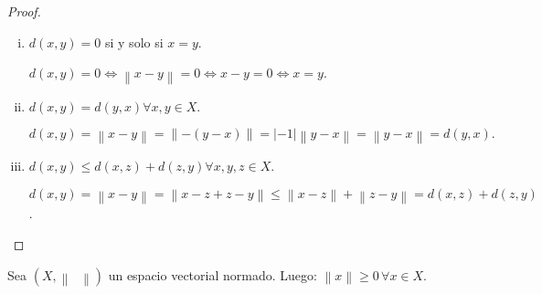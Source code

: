 \begin{proof}\leavevmode
    \begin{enumerate}[i)]
        \item $d\left(x,y\right)=0$ si y solo si $x=y$.


              \begin{math}
                  d\left(x,y\right)=
                  0\iff
                  \left\|x-y\right\|=
                  0\iff
                  x-y=
                  0\iff
                  x=
                  y
              \end{math}.

        \item

              \begin{math}
                  d\left(x,y\right)=
                  d\left(y,x\right)\forall
                  x,y\in X
              \end{math}.

              \begin{math}
                  d\left(x,y\right)=
                  \left\|x-y\right\|=
                  \left\|-\left(y-x\right)\right\|=
                  \left|-1\right|\left\|y-x\right\|=
                  \left\|y-x\right\|=
                  d\left(y,x\right).
              \end{math}


        \item

              \begin{math}
                  d\left(x,y\right)\leq
                  d\left(x,z\right)+d\left(z,y\right)\forall
                  x,y,z\in X
              \end{math}.

              \begin{math}
                  d\left(x,y\right)=
                  \left\|x-y\right\|=
                  \left\|x-z+z-y\right\|\leq
                  \left\|x-z\right\|+\left\|z-y\right\|=
                  d\left(x,z\right)+d\left(z,y\right)
              \end{math}.
    \end{enumerate}
\end{proof}

\begin{proposition*}
    Sea $\left(X, \left\|\phantom{\cdot}\right\|\right)$ un
    espacio vectorial normado.
    Luego:
    \begin{math}
        \left\|x\right\|\geq
        0\,\forall
        x\in X
    \end{math}.
\end{proposition*}

